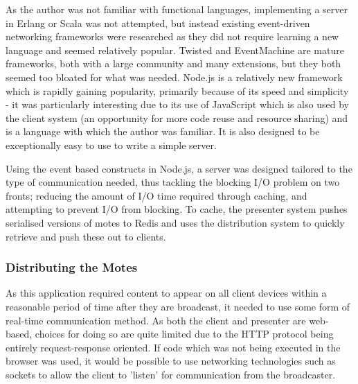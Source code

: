 \documentclass[a4papert,11pt,notitlepage]{article}
\begin{document}
As the author was not familiar with functional languages, implementing a server in Erlang\cite{erlang:web} or Scala\cite{scala:web} was not attempted, but instead existing event-driven networking frameworks were researched as they did not require learning a new language and seemed relatively popular. Twisted and EventMachine are mature frameworks, both with a large community and many extensions, but they both seemed too bloated for what was needed. Node.js is a relatively new framework which is rapidly gaining popularity, primarily because of its speed and simplicity - it was particularly interesting due to its use of JavaScript which is also used by the client system (an opportunity for more code reuse and resource sharing) and is a language with which the author was familiar. It is also designed to be exceptionally easy to use to write a simple server.

Using the event based constructs\cite{nodejspresentation:web} in Node.js, a server was designed tailored to the type of communication needed, thus tackling the blocking I/O problem on two fronts; reducing the amount of I/O time required through caching, and attempting to prevent I/O from blocking. To cache, the presenter system pushes serialised versions of motes to Redis and uses the distribution system to quickly retrieve and push these out to clients.

\subsubsection{Distributing the Motes}
As this application required content to appear on all client devices within a reasonable period of time after they are broadcast, it needed to use some form of real-time communication method. As both the client and presenter are web-based, choices for doing so are quite limited due to the HTTP protocol being entirely request-response oriented. If code which was not being executed in the browser was used, it would be possible to use networking technologies such as sockets to allow the client to 'listen' for communication from the broadcaster.
\end{document}
